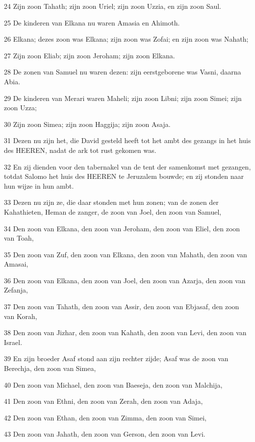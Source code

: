 \par 24 Zijn zoon Tahath; zijn zoon Uriel; zijn zoon Uzzia, en zijn zoon Saul.
\par 25 De kinderen van Elkana nu waren Amasia en Ahimoth.
\par 26 Elkana; dezes zoon was Elkana; zijn zoon was Zofai; en zijn zoon was Nahath;
\par 27 Zijn zoon Eliab; zijn zoon Jeroham; zijn zoon Elkana.
\par 28 De zonen van Samuel nu waren dezen: zijn eerstgeborene was Vasni, daarna Abia.
\par 29 De kinderen van Merari waren Maheli; zijn zoon Libni; zijn zoon Simei; zijn zoon Uzza;
\par 30 Zijn zoon Simea; zijn zoon Haggija; zijn zoon Asaja.
\par 31 Dezen nu zijn het, die David gesteld heeft tot het ambt des gezangs in het huis des HEEREN, nadat de ark tot rust gekomen was.
\par 32 En zij dienden voor den tabernakel van de tent der samenkomst met gezangen, totdat Salomo het huis des HEEREN te Jeruzalem bouwde; en zij stonden naar hun wijze in hun ambt.
\par 33 Dezen nu zijn ze, die daar stonden met hun zonen; van de zonen der Kahathieten, Heman de zanger, de zoon van Joel, den zoon van Samuel,
\par 34 Den zoon van Elkana, den zoon van Jeroham, den zoon van Eliel, den zoon van Toah,
\par 35 Den zoon van Zuf, den zoon van Elkana, den zoon van Mahath, den zoon van Amasai,
\par 36 Den zoon van Elkana, den zoon van Joel, den zoon van Azarja, den zoon van Zefanja,
\par 37 Den zoon van Tahath, den zoon van Assir, den zoon van Ebjasaf, den zoon van Korah,
\par 38 Den zoon van Jizhar, den zoon van Kahath, den zoon van Levi, den zoon van Israel.
\par 39 En zijn broeder Asaf stond aan zijn rechter zijde; Asaf was de zoon van Berechja, den zoon van Simea,
\par 40 Den zoon van Michael, den zoon van Baeseja, den zoon van Malchija,
\par 41 Den zoon van Ethni, den zoon van Zerah, den zoon van Adaja,
\par 42 Den zoon van Ethan, den zoon van Zimma, den zoon van Simei,
\par 43 Den zoon van Jahath, den zoon van Gerson, den zoon van Levi.
